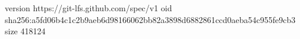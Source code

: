 version https://git-lfs.github.com/spec/v1
oid sha256:a5fd06b4c1c2b9aeb6d98166062bb82a3898d6882861ccd0aeba54c955fe9cb3
size 418124
